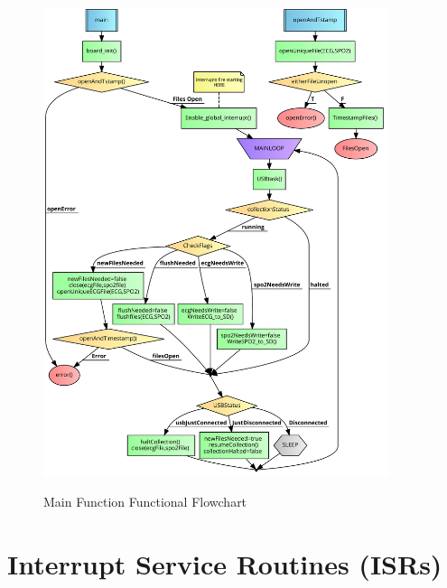 \begin{figure}
	\begin{center}
		\label{fig:flowchart_main}
		\includegraphics[scale=1,width=0.9\textwidth]{Images/FlowChartMain.pdf} 
		\caption{Main Function Functional Flowchart}
	\end{center}
\end{figure}

\section {Interrupt Service Routines (ISRs)}

